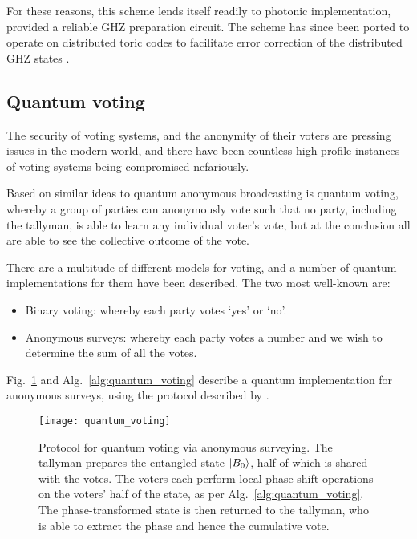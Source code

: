 For these reasons, this scheme lends itself readily to photonic implementation, provided a reliable GHZ preparation circuit. The scheme has since been ported to operate on distributed toric codes to facilitate error correction of the distributed GHZ states \cite{bib:MenicucciExpQAB}.

%
%

\subsection{Quantum voting}

The security of voting systems, and the anonymity of their voters are pressing issues in the modern world, and there have been countless high-profile instances of voting systems being compromised nefariously.

Based on similar ideas to quantum anonymous broadcasting is quantum voting, whereby a group of parties can anonymously vote such that no party, including the tallyman, is able to learn any individual voter's vote, but at the conclusion all are able to see the collective outcome of the vote.

There are a multitude of different models for voting, and a number of quantum implementations for them have been described. The two most well-known are:
\begin{itemize}
	\item Binary voting: whereby each party votes `yes' or `no'. 
	\item Anonymous surveys: whereby each party votes a number and we wish to determine the sum of all the votes.
\end{itemize}

Fig.~\ref{fig:quantum_voting} and Alg.~\ref{alg:quantum_voting} describe a quantum implementation for anonymous surveys, using the protocol described by \cite{bib:VaccaroVoting}.

\begin{figure}[!htbp]
\texttt{[image: quantum\_voting]}
\captionspacefig \caption{Protocol for quantum voting via anonymous surveying. The tallyman prepares the entangled state $|B_0\rangle$, half of which is shared with the votes. The voters each perform local phase-shift operations on the voters' half of the state, as per Alg.~\ref{alg:quantum_voting}. The phase-transformed state is then returned to the tallyman, who is able to extract the phase and hence the cumulative vote.}\label{fig:quantum_voting}	
\end{figure}

